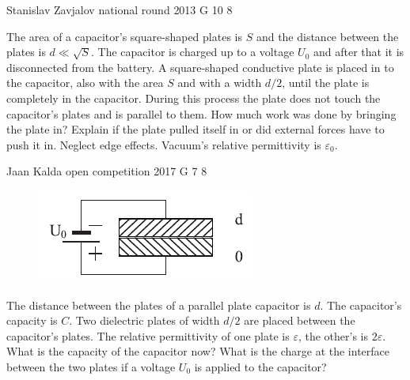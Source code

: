 \documentclass[11pt]{article}
\begin{document}
{Stanislav Zavjalov} %
{national round} %
{2013} %
{G 10} %
{8} %
{

\ifEngStatement
The area of a capacitor’s square-shaped plates is $S$ and the distance between the plates is $d \ll \sqrt{S}$. The capacitor is charged up to a voltage $U_0$ and after that it is disconnected from the battery. A square-shaped conductive plate is placed in to the capacitor, also with the area $S$ and with a width $d/2$, until the plate is completely in the capacitor. During this process the plate does not touch the capacitor’s plates and is parallel to them. How much work was done by bringing the plate in? Explain if the plate pulled itself in or did external forces have to push it in. Neglect edge effects. Vacuum’s relative permittivity is $\varepsilon_0$.
\fi
}

{Jaan Kalda} %
{open competition} %
{2017} %
{G 7} %
{8} %
{

\ifEngStatement
\begin{figure}
	\vspace{-13pt}
	\includegraphics[width=\linewidth]{2017-lahg-07-res-cap2}
\end{figure}
The distance between the plates of a parallel plate capacitor is $d$. The capacitor’s capacity is $C$. Two dielectric plates of width $d/2$ are placed between the capacitor’s plates. The relative permittivity of one plate is $\varepsilon$, the other’s is $2\varepsilon$. What is the capacity of the capacitor now? What is the charge at the interface between the two plates if a voltage $U_0$ is applied to the capacitor?
\fi
}
\end{document}

